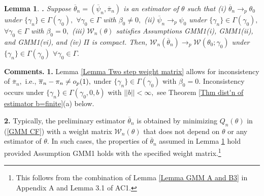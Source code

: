\documentclass[12pt,titlepage,final,oneside,letterpaper]{article}
\newtheorem{lemma}{Lemma}[section]
\begin{document}
\begin{lemma}
\hspace{-0.08in}\textbf{.} \label{Lemma Two step weight matrix}Suppose $%
\overline{\theta }_{n}=(\overline{\psi }_{n},\overline{\pi }_{n})$ is an
estimator of $\theta $ such that \emph{(i)} $\overline{\theta }%
_{n}\rightarrow _{p}\theta _{0}$ under $\{\gamma _{n}\}\in \Gamma (\gamma
_{0}),$ $\forall \gamma _{0}\in \Gamma $ with $\beta _{0}\neq 0,$ \emph{(ii)}
$\overline{\psi }_{n}\rightarrow _{p}\psi _{0}$ under $\{\gamma _{n}\}\in
\Gamma (\gamma _{0}),$ $\forall \gamma _{0}\in \Gamma $ with $\beta _{0}=0,$ 
\emph{(iii)} $\mathcal{W}_{n}(\theta )$ satisfies Assumptions \emph{GMM1(i),}
\emph{GMM1(ii),} and \emph{GMM1(vi),} and \emph{(iv)} $\Pi $ is compact.
Then, $\mathcal{W}_{n}(\overline{\theta }_{n})\rightarrow _{p}\mathcal{W}%
(\theta _{0};\gamma _{0})$ under $\{\gamma _{n}\}\in \Gamma (\gamma _{0})$ $%
\forall \gamma _{0}\in \Gamma .$
\end{lemma}

\noindent \textbf{Comments.} \textbf{1.} Lemma \ref{Lemma Two step weight
matrix} allows for inconsistency of $\overline{\pi }_{n},$ i.e., $\overline{%
\pi }_{n}-\pi _{n}\neq o_{p}(1),$ under $\{\gamma _{n}\}\in \Gamma (\gamma
_{0})$ with $\beta _{0}=0.$ Inconsistency occurs under $\{\gamma _{n}\}\in
\Gamma (\gamma _{0},0,b)$ with $||b||<\infty ,$ see Theorem \ref{Thm dist'n
of estimator b=finite}(a) below.

\textbf{2.} Typically, the preliminary estimator $\overline{\theta }_{n}$ is
obtained by minimizing $Q_{n}(\theta )$ in (\ref{GMM CF}) with a weight
matrix $\mathcal{W}_{n}(\theta )$ that does not depend on $\theta $ or any
estimator of $\theta .$ In such cases, the properties of $\overline{\theta }%
_{n}$ assumed in Lemma \ref{Lemma Two step weight matrix} hold provided
Assumption GMM1 holds with the specified weight matrix.\footnote{%
This follows from the combination of Lemma \ref{Lemma GMM A and B3} in
Appendix A and Lemma 3.1 of AC1.}\medskip
\end{document}
